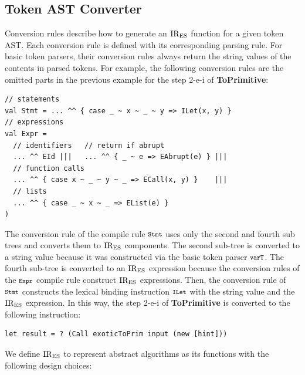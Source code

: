 \subsection{Token AST Converter}
Conversion rules describe how to generate an \( \text{IR}_\text{ES} \) function for a
given token AST.  Each conversion rule is defined with its
corresponding parsing rule.  For basic token parsers, their conversion
rules always return the string values of the contents in parsed tokens.
For example, the following conversion rules are the omitted parts
in the previous example for the step 2-e-i of \textbf{ToPrimitive}:
\begin{lstlisting}[style=myScalastyle]
// statements
val Stmt = ... ^^ { case _ ~ x ~ _ ~ y => ILet(x, y) }
// expressions
val Expr =
  // identifiers   // return if abrupt
  ... ^^ EId |||   ... ^^ { _ ~ e => EAbrupt(e) } |||
  // function calls
  ... ^^ { case x ~ _ ~ y ~ _ => ECall(x, y) }    |||
  // lists
  ... ^^ { case _ ~ x ~ _ => EList(e) }
)
\end{lstlisting}
The conversion rule of the compile rule \( \texttt{\footnotesize Stmt} \) uses only
the second and fourth sub trees and converts them to \( \text{IR}_\text{ES} \)
components.  The second sub-tree is converted to a string value
because it was constructed via the basic token parser \( \texttt{\footnotesize varT} \).
The fourth sub-tree is converted to an \( \text{IR}_\text{ES} \) expression
because the conversion rules of the \( \texttt{\footnotesize Expr} \) compile rule
construct \( \text{IR}_\text{ES} \) expressions.  Then, the conversion rule of
\( \texttt{\footnotesize Stmt} \) constructs the lexical binding instruction \( \texttt{\footnotesize ILet} \)
with the string value and the \( \text{IR}_\text{ES} \) expression.  In this way,
the step 2-e-i of \textbf{ToPrimitive} is converted to the following
instruction:
\begin{lstlisting}[style=ires]
let result = ? (Call exoticToPrim input (new [hint]))
\end{lstlisting}

We define \( \text{IR}_\text{ES} \) to represent abstract algorithms as its
functions with the following design choices:

